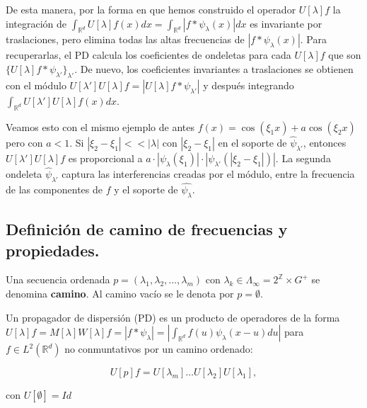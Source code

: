 \noindent De esta manera, por la forma en que hemos construido el operador $U[\lambda] f$ la integración de $\int_{\mathbb{R}^d}U[\lambda]f(x) dx= \int_{\mathbb{R}^d} | f \ast \psi_\lambda(x)|dx$ es invariante por traslaciones, pero elimina todas las altas frecuencias de $|f \ast \psi_\lambda(x)|$. Para recuperarlas, el PD calcula los coeficientes de ondeletas para cada $U[\lambda]f$ que son $\lbrace U[\lambda]f \ast \psi_{\lambda'}\rbrace_{\lambda'}$. De nuevo, los coeficientes invariantes a traslaciones se obtienen con el módulo $U[\lambda']U[\lambda]f=|U[\lambda]f \ast \psi_{\lambda'}|$ y después integrando $\int_{\mathbb{R}^d} U[\lambda']U[\lambda]f(x) dx$. 

\medskip

\noindent Veamos esto con el mismo ejemplo de antes $f(x)=\cos(\xi_1 x)+a\cos(\xi_2 x)$ pero con $a<1$. Si $|\xi_2-\xi_1| << |\lambda|$ con $|\xi_2 - \xi_1|$ en el soporte de $\widehat{\psi}_{\lambda'}$, entonces $U[\lambda']U[\lambda]f$ es proporcional a $a\cdot |\psi_\lambda(\xi_1)|\cdot |\psi_{\lambda'}(|\xi_2-\xi_1|)|$. La segunda ondeleta $\widehat{\psi}_{\lambda'}$ captura las interferencias creadas por el módulo, entre la frecuencia de las componentes de $f$ y el soporte de $\widehat{\psi_\lambda}$.

\medskip

\subsection{Definición de camino de frecuencias y propiedades.}

\begin{definicion}
Una secuencia ordenada $p=(\lambda_1,\lambda_2, \ldots , \lambda_m)$ con $\lambda_k \in \Lambda_\infty=2^{\mathbb{Z}} \times G^{+} $ se denomina \textbf{camino}. Al camino vacío se le denota por $p=\emptyset$. 
\end{definicion}


\begin{definicion}
Un propagador de dispersión (PD) es un producto de operadores de la forma $U[\lambda]f=M[\lambda]W[\lambda]f=|f \ast \psi_\lambda|=\left | \int_{\mathbb{R}^d} f(u)\psi_\lambda(x-u) du \right|$ para $f \in L^2(\mathbb{R}^d)$ no conmuntativos por un camino ordenado:

\begin{equation}
  U[p]f=U[\lambda_m] \ldots U[\lambda_2]U[\lambda_1],
\end{equation}

con $U[\emptyset]=Id$
\end{definicion}

